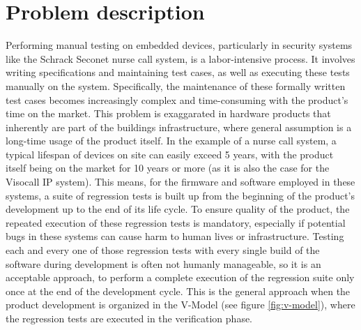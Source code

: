 \documentclass[Proposal,BIC,english,fhCitStyle,IEEE]{BASE/twbook} %
\begin{document}
\chapter{Problem description}
Performing manual testing on embedded devices, particularly in security systems like the Schrack Seconet nurse call system, is a labor-intensive process. It involves writing specifications and maintaining test cases, as well as executing these tests manually on the system. Specifically, the maintenance of these formally written test cases becomes increasingly complex and time-consuming with the product's time on the market. This problem is exaggarated in hardware products that inherently are part of the buildings infrastructure, where general assumption is a long-time usage of the product itself. In the example of a nurse call system, a typical lifespan of devices on site can easily exceed 5 years, with the product itself being on the market for 10 years or more (as it is also the case for the Visocall IP system).
This means, for the firmware and software employed in these systems, a suite of regression tests is built up from the beginning of the product's development up to the end of its life cycle. To ensure quality of the product, the repeated execution of these regression tests is mandatory, especially if potential bugs in these systems can cause harm to human lives or infrastructure.
Testing each and every one of those regression tests with every single build of the software during development is often not humanly manageable, so it is an acceptable approach, to perform a complete execution of the regression suite only once at the end of the development cycle. This is the general approach when the product development is organized in the V-Model (see figure \ref{fig:v-model}), where the regression tests are executed in the verification phase.
\end{document}
